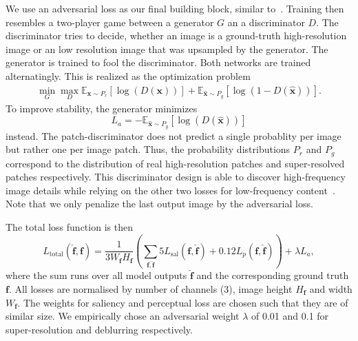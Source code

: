 \documentclass{scrartcl}
\newcommand{\img}{\bm{f}} %
\begin{document}
We use an adversarial loss as our final building block, similar to~\cite{SRGAN}.
Training then resembles a two-player game between a generator \(G\) an a discriminator \(D\).
The discriminator tries to decide, whether an image is a ground-truth high-resolution image or an low resolution image that was upsampled by the generator.
The generator is trained to fool the discriminator.
Both networks are trained alternatingly.
This is realized as the optimization problem~\cite{GAN}
\begin{align}
 \min_G \max_D \mathbb{E}_{\bm{x} \sim P_r} \left[ \log (D({\bm{x}})) \right] +
  \mathbb{E}_{\hat{\bm{x}} \sim P_g} \left[  \log (1 - D(\hat{\bm{x}})) \right].
\end{align}
To improve stability, the generator minimizes
\begin{equation}
  L_a = - \mathbb{E}_{\hat{\bm{x}} \sim P_g} \left[ \log (D(\hat{\bm{x}})) \right]
\end{equation}
instead.
The patch-discriminator does not predict a single probablity per image but rather one per image patch.
Thus, the probability distributions $P_r$ and $P_g$ correspond to the distribution of real high-resolution patches and super-resolved patches respectively.
This discriminator design is able to discover high-frequency image details while relying on the other two losses for low-frequency content~\cite{PatchGAN}.
Note that we only penalize the last output image by the adversarial loss.

The total loss function is then
\begin{equation}
  \label{eq:total-loss}
L_\text{total}(\hat{\img}, \img) = \frac{1}{3 W_{\img} H_{\img}}
\left( \sum_{\img, \hat{\img}}
  5 L_{\text{sal}} (\img, \hat{\img}) + 0.12  L_p(\img, \hat{\img}) \right) + \lambda L_a,
\end{equation}
where the sum runs over all model outputs \(\hat{\img}\) and the corresponding ground truth \(\img\).
All losses are normalised by number of channels (3), image height \(H_{\img}\) and width \(W_{\img}\).
The weights for saliency and perceptual loss are chosen such that they are of similar size.
We empirically chose an adversarial weight $\lambda$ of 0.01 and 0.1 for super-resolution and deblurring respectively.
\end{document}
